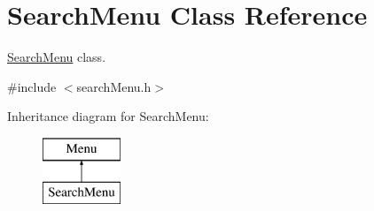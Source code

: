 \hypertarget{class_search_menu}{}\section{Search\+Menu Class Reference}
\label{class_search_menu}


\hyperlink{class_search_menu}{Search\+Menu} class.  




{\ttfamily \#include $<$search\+Menu.\+h$>$}

Inheritance diagram for Search\+Menu\+:\begin{figure}[H]
\begin{center}
\leavevmode
\includegraphics[height=2.000000cm]{class_search_menu}
\end{center}
\end{figure}
